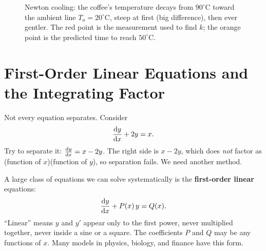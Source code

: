 \begin{figure}[htbp]
\centering
{}
\caption{Newton cooling: the coffee's temperature decays from $90^\circ$C toward the
ambient line $T_{\!a}=20^\circ$C, steep at first (big difference), then ever gentler.
The red point is the measurement used to find $k$; the orange point is the
predicted time to reach $50^\circ$C.}
\label{ch37:cooling}
\end{figure}

\section{First-Order Linear Equations and the Integrating Factor}

Not every equation separates. Consider
\[
  \frac{\mathrm{d} y}{\mathrm{d} x} + 2y = x.
\]
Try to separate it: $\frac{\mathrm{d} y}{\mathrm{d} x} = x - 2y$. The right side is $x-2y$, which does
\emph{not} factor as (function of $x$)(function of $y$), so separation fails. We
need another method.

A large class of equations we can solve systematically is the \textbf{first-order linear} equations:
\[
  \frac{\mathrm{d} y}{\mathrm{d} x} + P(x)\,y = Q(x).
\]
``Linear'' means $y$ and $y'$ appear only to the first power, never multiplied
together, never inside a sine or a square. The coefficients $P$ and $Q$ may be any
functions of $x$. Many models in physics, biology, and finance have this form.

